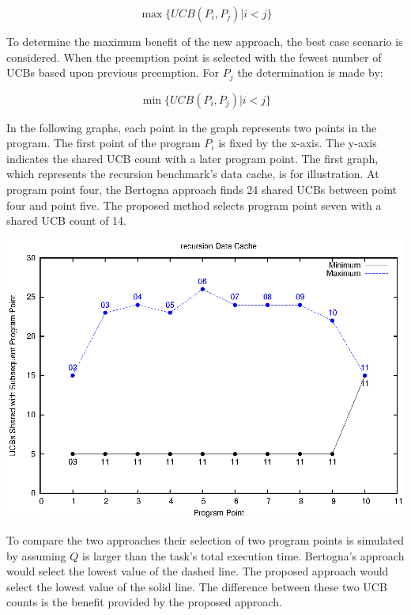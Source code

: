 \begin{equation*}
  \max\{ UCB(P_i, P_j) \vert i < j \}
\end{equation*}

To determine the maximum benefit of the new approach, the best case
scenario is considered. When the preemption point is selected with the
fewest number of UCBs based upon previous preemption.  For ${P_j}$ the
determination is made by:

\begin{equation*}
  \min\{ UCB(P_i, P_j) \vert i < j \}
\end{equation*}


In the following graphs, each point in the graph represents two points
in the program. The first point of the program ${P_i}$ is fixed by the
x-axis. The y-axis indicates the shared UCB count with a later program
point. The first graph, which represents the recursion benchmark's
data cache, is for illustration. At program point four, the Bertogna
approach finds 24 shared UCBs between point four and point five. The
proposed method selects program point seven with a shared UCB count of
14. 

\begin{center}
  \includegraphics[width=\linewidth]{eps/recursion-dcache.eps}
\end{center}

To compare the two approaches their selection of two program points is
simulated by assuming ${Q}$ is larger than the task's total execution
time. Bertogna's approach would select the lowest value of the 
dashed line. The proposed approach would select the lowest value of
the solid line. The difference between these two UCB counts is the
benefit provided by the proposed approach.
 
